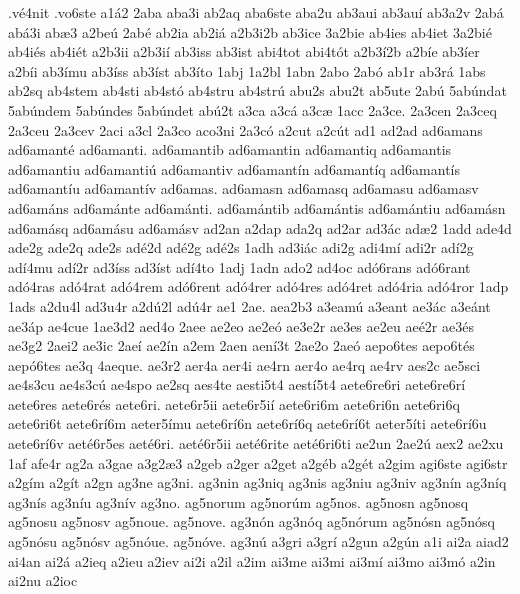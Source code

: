 {.v^^e94nit
.vo6ste
a1^^e12
2aba
aba3i
ab2aq
aba6ste
aba2u
ab3aui
ab3au^^ed
ab3a2v
2ab^^e1
ab^^e13i
ab^^e63
a2be^^fa
2ab^^e9
ab2ia
ab2i^^e1
a2b3i2b
ab3ice
3a2bie
ab4ies
ab4iet
3a2bi^^e9
ab4i^^e9s
ab4i^^e9t
a2b3ii
a2b3i^^ed
ab3iss
ab3ist
abi4tot
abi4t^^f3t
a2b3^^ed2b
a2b^^ede
ab3^^eder
a2b^^edi
ab3^^edmu
ab3^^edss
ab3^^edst
ab3^^edto
1abj
1a2bl
1abn
2abo
2ab^^f3
ab1r
ab3r^^e1
1abs
ab2sq
ab4stem
ab4sti
ab4st^^f3
ab4stru
ab4str^^fa
abu2s
abu2t
ab5ute
2ab^^fa
5ab^^fandat
5ab^^fandem
5ab^^fandes
5ab^^fandet
ab^^fa2t
a3ca
a3c^^e1
a3c^^e6
1acc
2a3ce.
2a3cen
2a3ceq
2a3ceu
2a3cev
2aci
a3cl
2a3co
aco3ni
2a3c^^f3
a2cut
a2c^^fat
ad1
ad2ad
ad6amans
ad6amant^^e9
ad6amanti.
ad6amantib
ad6amantin
ad6amantiq
ad6amantis
ad6amantiu
ad6amanti^^fa
ad6amantiv
ad6amant^^edn
ad6amant^^edq
ad6amant^^eds
ad6amant^^edu
ad6amant^^edv
ad6amas.
ad6amasn
ad6amasq
ad6amasu
ad6amasv
ad6am^^e1ns
ad6am^^e1nte
ad6am^^e1nti.
ad6am^^e1ntib
ad6am^^e1ntis
ad6am^^e1ntiu
ad6am^^e1sn
ad6am^^e1sq
ad6am^^e1su
ad6am^^e1sv
ad2an
a2dap
ada2q
ad2ar
ad3^^e1c
ad^^e62
1add
ade4d
ade2g
ade2q
ade2s
ad^^e92d
ad^^e92g
ad^^e92s
1adh
ad3i^^e1c
adi2g
adi4m^^ed
adi2r
ad^^ed2g
ad^^ed4mu
ad^^ed2r
ad3^^edss
ad3^^edst
ad^^ed4to
1adj
1adn
ado2
ad4oc
ad^^f36rans
ad^^f36rant
ad^^f34ras
ad^^f34rat
ad^^f34rem
ad^^f36rent
ad^^f34rer
ad^^f34res
ad^^f34ret
ad^^f34ria
ad^^f34ror
1adp
1ads
a2du4l
ad3u4r
a2d^^fa2l
ad^^fa4r
ae1
2ae.
aea2b3
a3eam^^fa
a3eant
ae3^^e1c
a3e^^e1nt
ae3^^e1p
ae4cue
1ae3d2
aed4o
2aee
ae2eo
ae2e^^f3
ae3e2r
ae3es
ae2eu
ae^^e92r
ae3^^e9s
ae3g2
2aei2
ae3ic
2ae^^ed
ae2^^edn
a2em
2aen
aen^^ed3t
2ae2o
2ae^^f3
aepo6tes
aepo6t^^e9s
aep^^f36tes
ae3q
4aeque.
ae3r2
aer4a
aer4i
ae4rn
aer4o
ae4rq
ae4rv
aes2c
ae5sci
ae4s3cu
ae4s3c^^fa
ae4spo
ae2sq
aes4te
aesti5t4
aest^^ed5t4
aete6re6ri
aete6re6r^^ed
aete6res
aete6r^^e9s
aete6ri.
aete6r5ii
aete6r5i^^ed
aete6ri6m
aete6ri6n
aete6ri6q
aete6ri6t
aete6r^^ed6m
aeter5^^edmu
aete6r^^ed6n
aete6r^^ed6q
aete6r^^ed6t
aeter5^^edti
aete6r^^ed6u
aete6r^^ed6v
aet^^e96r5es
aet^^e96ri.
aet^^e96r5ii
aet^^e96rite
aet^^e96ri6ti
ae2un
2ae2^^fa
aex2
ae2xu
1af
afe4r
ag2a
a3gae
a3g2^^e63
a2geb
a2ger
a2get
a2g^^e9b
a2g^^e9t
a2gim
agi6ste
agi6str
a2g^^edm
a2g^^edt
a2gn
ag3ne
ag3ni.
ag3nin
ag3niq
ag3nis
ag3niu
ag3niv
ag3n^^edn
ag3n^^edq
ag3n^^eds
ag3n^^edu
ag3n^^edv
ag3no.
ag5norum
ag5nor^^fam
ag5nos.
ag5nosn
ag5nosq
ag5nosu
ag5nosv
ag5noue.
ag5nove.
ag3n^^f3n
ag3n^^f3q
ag5n^^f3rum
ag5n^^f3sn
ag5n^^f3sq
ag5n^^f3su
ag5n^^f3sv
ag5n^^f3ue.
ag5n^^f3ve.
ag3n^^fa
a3gri
a3gr^^ed
a2gun
a2g^^fan
a1i
ai2a
aiad2
ai4an
ai2^^e1
a2ieq
a2ieu
a2iev
ai2i
a2il
a2im
ai3me
ai3mi
ai3m^^ed
ai3mo
ai3m^^f3
a2in
ai2nu
a2ioc
}
